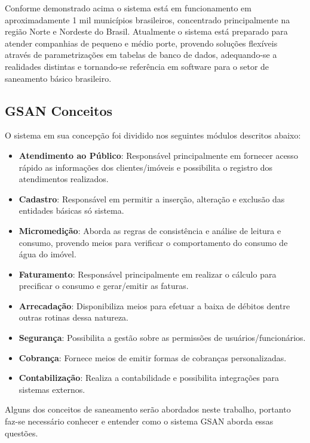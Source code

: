 Conforme demonstrado acima o sistema está em funcionamento em aproximadamente 1 mil municípios brasileiros, concentrado principalmente na região Norte e Nordeste do Brasil.
Atualmente o sistema está preparado para atender companhias de pequeno e médio porte, provendo soluções flexíveis através de parametrizações em tabelas de banco de dados, adequando-se a realidades distintas e tornando-se referência em software para o setor de saneamento básico brasileiro. 

\subsection{GSAN Conceitos}

O sistema em sua concepção foi dividido nos seguintes módulos descritos abaixo:
\begin{itemize}
\item \textbf{Atendimento ao Público}: Responsável principalmente em fornecer acesso rápido as informações dos clientes/imóveis e possibilita o registro dos atendimentos realizados.
\item \textbf{Cadastro}: Responsável em permitir a inserção, alteração e exclusão das entidades básicas só sistema.
\item \textbf{Micromedição}: Aborda as regras de consistência e análise de leitura e consumo, provendo meios para verificar o comportamento do consumo de água do imóvel.
\item \textbf{Faturamento}: Responsável principalmente em realizar o cálculo para precificar o consumo e gerar/emitir as faturas.
\item \textbf{Arrecadação}: Disponibiliza meios para efetuar a baixa de débitos dentre outras rotinas dessa natureza.
\item \textbf{Segurança}: Possibilita a gestão sobre as permissões de usuários/funcionários.
\item \textbf{Cobrança}: Fornece meios de emitir formas de cobranças personalizadas.
\item \textbf{Contabilização}: Realiza a contabilidade e possibilita integrações para sistemas externos.
\end{itemize}

Alguns dos conceitos de saneamento serão abordados neste trabalho, portanto faz-se necessário conhecer e entender como o sistema GSAN aborda essas questões.

